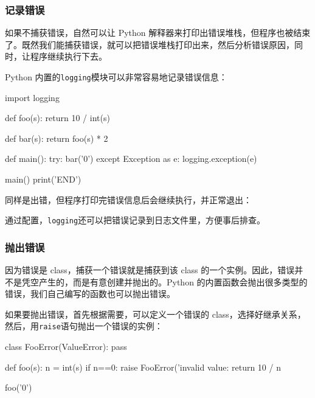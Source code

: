 \hypertarget{ux8bb0ux5f55ux9519ux8bef}{%
\subsubsection{记录错误}\label{ux8bb0ux5f55ux9519ux8bef}}

如果不捕获错误，自然可以让 Python
解释器来打印出错误堆栈，但程序也被结束了。既然我们能捕获错误，就可以把错误堆栈打印出来，然后分析错误原因，同时，让程序继续执行下去。

Python 内置的\texttt{logging}模块可以非常容易地记录错误信息：

\begin{pythoncode}
import logging

def foo(s):
    return 10 / int(s)

def bar(s):
    return foo(s) * 2

def main():
    try:
        bar('0')
    except Exception as e:
        logging.exception(e)

main()
print('END')
\end{pythoncode}

同样是出错，但程序打印完错误信息后会继续执行，并正常退出：


通过配置，\texttt{logging}还可以把错误记录到日志文件里，方便事后排查。

\hypertarget{ux629bux51faux9519ux8bef}{%
\subsubsection{抛出错误}\label{ux629bux51faux9519ux8bef}}

因为错误是 class，捕获一个错误就是捕获到该 class
的一个实例。因此，错误并不是凭空产生的，而是有意创建并抛出的。Python
的内置函数会抛出很多类型的错误，我们自己编写的函数也可以抛出错误。

如果要抛出错误，首先根据需要，可以定义一个错误的
class，选择好继承关系，然后，用\texttt{raise}语句抛出一个错误的实例：

\begin{pythoncode}
class FooError(ValueError):
    pass

def foo(s):
    n = int(s)
    if n==0:
        raise FooError('invalid value: %
    return 10 / n

foo('0')
\end{pythoncode}

